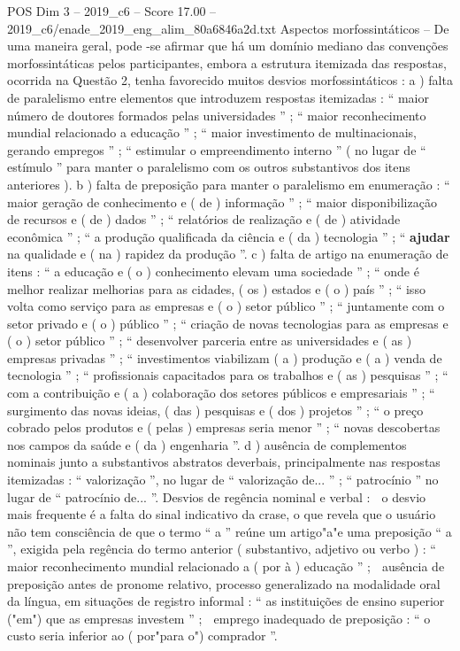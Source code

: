 \begin{textsample}{POS Dim 3 – 2019\_c6 – Score 17.00 – 2019\_c6/enade\_2019\_eng\_alim\_80a6846a2d.txt}
Aspectos morfossintáticos – De uma maneira geral, pode -se afirmar que há um domínio mediano das convenções morfossintáticas pelos participantes, embora a estrutura itemizada das respostas, ocorrida na Questão 2, tenha favorecido muitos desvios morfossintáticos : a ) falta de paralelismo entre elementos que introduzem respostas itemizadas : “ maior número de doutores formados pelas universidades ” ; “ maior reconhecimento mundial relacionado a educação ” ; “ maior investimento de multinacionais, gerando empregos ” ; “ estimular o empreendimento interno ” ( no lugar de “ estímulo ” para manter o paralelismo com os outros substantivos dos itens anteriores ). b ) falta de preposição para manter o paralelismo em enumeração : “ maior geração de conhecimento e ( de ) informação ” ; “ maior disponibilização de recursos e ( de ) dados ” ; “ relatórios de realização e ( de ) atividade econômica ” ; “ a produção qualificada da ciência e ( da ) tecnologia ” ; “ \textbf{ajudar} na qualidade e ( na ) rapidez da produção ”. c ) falta de artigo na enumeração de itens : “ a educação e ( o ) conhecimento elevam uma sociedade ” ; “ onde é melhor realizar melhorias para as cidades, ( os ) estados e ( o ) país ” ; “ isso volta como serviço para as empresas e ( o ) setor público ” ; “ juntamente com o setor privado e ( o ) público ” ; “ criação de novas tecnologias para as empresas e ( o ) setor público ” ; “ desenvolver parceria entre as universidades e ( as ) empresas privadas ” ; “ investimentos viabilizam ( a ) produção e ( a ) venda de tecnologia ” ; “ profissionais capacitados para os trabalhos e ( as ) pesquisas ” ; “ com a contribuição e ( a ) colaboração dos setores públicos e empresariais ” ; “ surgimento das novas ideias, ( das ) pesquisas e ( dos ) projetos ” ; “ o preço cobrado pelos produtos e ( pelas ) empresas seria menor ” ; “ novas descobertas nos campos da saúde e ( da ) engenharia ”. d ) ausência de complementos nominais junto a substantivos abstratos deverbais, principalmente nas respostas itemizadas : “ valorização ”, no lugar de “ valorização de... ” ; “ patrocínio ” no lugar de “ patrocínio de... ”.
Desvios de regência nominal e verbal :  o desvio mais frequente é a falta do sinal indicativo da crase, o que revela que o usuário não tem consciência de que o termo “ a ” reúne um artigo"a"e uma preposição “ a ”, exigida pela regência do termo anterior ( substantivo, adjetivo ou verbo ) : “ maior reconhecimento mundial relacionado a ( por à ) educação ” ;  ausência de preposição antes de pronome relativo, processo generalizado na modalidade oral da língua, em situações de registro informal : “ as instituições de ensino superior ("em") que as empresas investem ” ;  emprego inadequado de preposição : “ o custo seria inferior ao ( por"para o") comprador ”.

\end{textsample}
